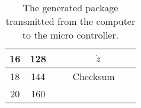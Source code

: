 \begin{table}[H]
\begin{tabular}{llclllllllllllllll}
		\multicolumn{1}{|c|}{16}   & \multicolumn{1}{c|}{128} & \multicolumn{5}{c|}{}                                                                                                      & \multicolumn{11}{c|}{$\dot{z}$}                                                                                                                                                                                                                                                        \\ \hline
		\multicolumn{1}{|c|}{18}   & \multicolumn{1}{c|}{144} & \multicolumn{16}{c|}{Checksum}                                                       \\ \hline
		\multicolumn{1}{|c|}{20}   & \multicolumn{1}{c|}{160} & \multicolumn{8}{c|}{}                                                                                                                                                                                 & \multicolumn{1}{c|}{}  & \multicolumn{1}{c|}{}  & \multicolumn{1}{c|}{}   & \multicolumn{1}{c|}{}   & \multicolumn{1}{c|}{}   & \multicolumn{1}{c|}{}   & \multicolumn{1}{c|}{}   & \multicolumn{1}{c|}{}   \\ \hline
	\end{tabular}
	\caption{The generated package transmitted from the computer to the micro controller.}
	\label{tab:Packagestructure2}
\end{table}
